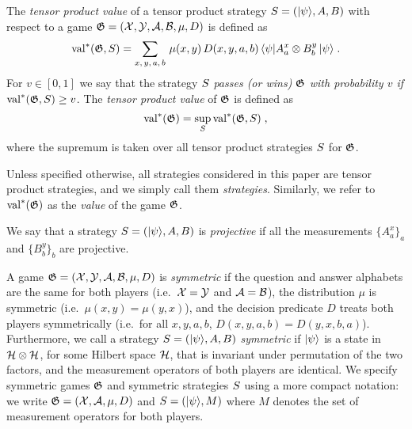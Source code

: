 \begin{definition}
  \label{def:tensor-product-value}
	The \emph{tensor product value} of a tensor product strategy $\strategy =
  (\ket{\psi}, A, B)$  with respect to a game $\game=(\cal{X}, \cal{Y}, \cal{A},
  \cal{B}, \mu, D)$ is defined as
  \begin{equation*}
		\val^*(\game, \strategy) = \sum_{x,\, y,\, a,\, b} \, \mu(x,y)\, D(x,y,a,b)\,
    \bra{\psi} A^x_a \otimes B^y_b\, \ket{\psi}\;.
  \end{equation*}
	For $v\in[0,1]$ we say that the strategy $\strategy$ \emph{passes (or wins)
    $\game$ with probability $v$ if} $\val^*(\game, \strategy) \geq v$.
  The \emph{tensor product value} of $\game$ is defined as
  \begin{equation*}
		\val^*(\game) = \sup_\strategy \val^*(\game, \strategy)\;,
  \end{equation*}
	where the supremum is taken over all tensor product strategies $\strategy$ for
  $\game$.
\end{definition}


\begin{remark}
  Unless specified otherwise, all strategies considered in this paper are tensor
  product strategies, and we simply call them \emph{strategies}.
  Similarly, we refer to $\val^*(\game)$ as the \emph{value} of the game
  $\game$.
\end{remark}


\begin{definition}
  \label{def:projective-strategy}
  We say that a strategy $\strategy = (\ket{\psi}, A, B)$ is \emph{projective} if
  all the measurements $\{A^x_a\}_a$ and $\{B^y_b\}_b$ are projective.
\end{definition}

\begin{remark}\label{rem:symmetric-games}
	A game $\game = (\cal{X}, \cal{Y}, \cal{A}, \cal{B}, \mu, D)$ is
  \emph{symmetric} if the question and answer alphabets are the same for both
  players (i.e.\
  $\cal{X} = \cal{Y}$ and $\cal{A} = \cal{B}$), the distribution $\mu$ is
  symmetric (i.e.\
  $\mu(x,y) = \mu(y,x)$), and the decision predicate $D$ treats both players
  symmetrically (i.e.\ for all $x,y,a,b$, $D(x,y,a,b) = D(y,x,b,a)$).
  Furthermore, we call a strategy $\strategy = (\ket{\psi}, A, B)$
  \emph{symmetric} if $\ket{\psi}$ is a state in $\mH \otimes \mH$, for some
  Hilbert space $\mH$, that is invariant under permutation of the two factors,
  and the measurement operators of both players are identical.
  We specify symmetric games $\game$ and symmetric strategies $\strategy$ using
  a more compact notation: we write $\game = (\cal{X}, \cal{A}, \mu, D)$ and
  $\strategy = (\ket{\psi}, M)$ where $M$ denotes the set of measurement
  operators for both players.
\end{remark}

